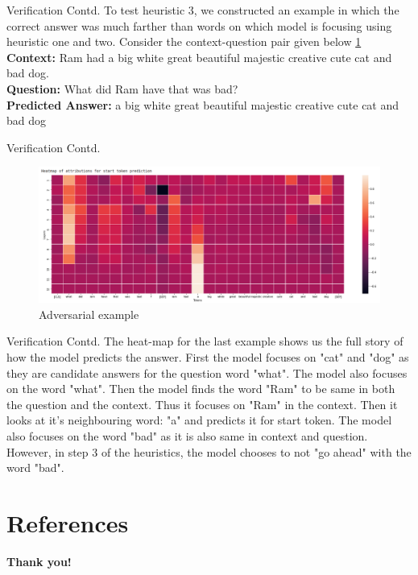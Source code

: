 \documentclass[10pt]{beamer}
\begin{document}
\begin{frame}{Verification Contd.}
To test heuristic 3, we constructed an example in which the correct answer was much farther than words on which model is focusing using heuristic one and two.
Consider the context-question pair given below \ref{obs2}\\
\textbf{Context: } Ram had a big white great beautiful majestic creative cute cat and bad dog.\\
\textbf{Question: } What did Ram have that was bad?\\
\textbf{Predicted Answer: } a big white great beautiful majestic creative cute cat and bad dog \\
\end{frame}
\begin{frame}{Verification Contd.}
\begin{figure}
    \centering
    \includegraphics[scale=0.25]{Screenshot from 2022-05-02 20-32-03.png}
    \caption{Adversarial example}
    \label{obs2}
\end{figure}
\end{frame}
\begin{frame}{Verification Contd.}
The heat-map for the last example shows us the full story of how the model predicts the answer. First the model focuses on "cat" and "dog" as they are candidate answers for the question word "what". The model also focuses on the word "what". Then the model finds the word "Ram" to be same in both the question and the context. Thus it focuses on "Ram" in the context. Then it looks at it's neighbouring word: "a" and predicts it for start token. The model also focuses on the word "bad" as it is also same in context and question. However, in step 3 of the heuristics, the model chooses to not "go ahead" with the word "bad". 
\end{frame}

\section{References}
\begin{frame}[allowframebreaks]

 
\end{frame}

\begin{frame}
\textcolor{myNewColorA}{\Huge{\centerline{\textbf{Thank you!}}}}
\end{frame}
\end{document}
